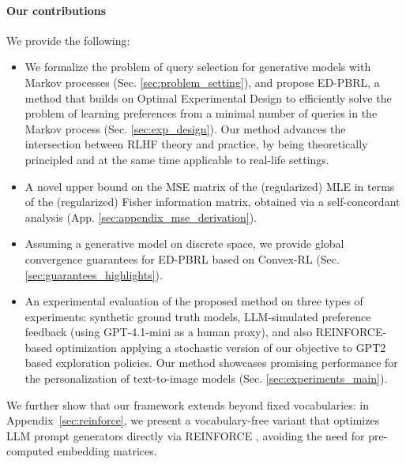 \documentclass{article}
\begin{document}
\vspace{-0.2cm}\paragraph{Our contributions} 
We provide the following:
\begin{itemize}
    \item We formalize the problem of query selection for generative models with Markov processes (Sec. \ref{sec:problem_setting}), and propose ED-PBRL, a method that builds on Optimal Experimental Design to efficiently solve the problem of learning preferences from a minimal number of queries in the Markov process (Sec. \ref{sec:exp_design}). Our method advances the intersection between RLHF theory and practice, by being theoretically principled and at the same time applicable to real-life settings.
    \item A novel upper bound on the MSE matrix of the (regularized) MLE in terms of the (regularized) Fisher information matrix, obtained via a self-concordant analysis (App. \ref{sec:appendix_mse_derivation}).
    \item Assuming a generative model on discrete space, we provide global convergence guarantees for ED-PBRL based on Convex-RL (Sec. \ref{sec:guarantees_highlights}).
    \item An experimental evaluation of the proposed method on three types of experiments: synthetic ground truth models, LLM-simulated preference feedback (using GPT-4.1-mini as a human proxy), and also REINFORCE-based optimization applying a stochastic version of our objective to GPT2 based exploration policies. Our method showcases promising performance for the personalization of text-to-image models (Sec. \ref{sec:experiments_main}).
\end{itemize}
We further show that our framework extends beyond fixed vocabularies: in Appendix~\ref{sec:reinforce}, we present a vocabulary-free variant that optimizes LLM prompt generators directly via REINFORCE \citep{williams1992simple}, avoiding the need for pre-computed embedding matrices.
\end{document}
